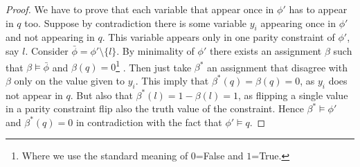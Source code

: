 \documentclass[a4paper,twoside,justified]{tufte-handout}
\begin{document}
\begin{proof}
We have to prove that each variable that appear once in $\phi'$ has to appear in $q$ too. 
Suppose by contradiction there is some variable $y_i$ appearing once in $\phi'$ and not appearing in $q$. 
This variable appears only in one parity constraint of $\phi'$, say $l$. Consider $\bar \phi=\phi'\setminus \{l\}$. 
By minimality of $\phi'$ there exists an assignment $\beta$ such that $\beta \models \bar \phi$ and $\beta(q)=0$\footnote{
Where we use the standard meaning of $0$=False and $1$=True.
}
. 
Then just take $\beta^*$ an assignment that disagree with $\beta$ only on the value given to $y_i$. 
This imply that $\beta^*(q)=\beta(q)=0$, as $y_i$ does not appear in $q$.
 But also that $\beta^*(l)=1-\beta(l)=1$, as flipping a single value in a parity constraint flip also the truth value of the constraint. 
 Hence $\beta^*\models \phi'$ and $\beta^*(q)=0$ in contradiction with the fact that $\phi'\models q$.
\end{proof}



\end{document}
